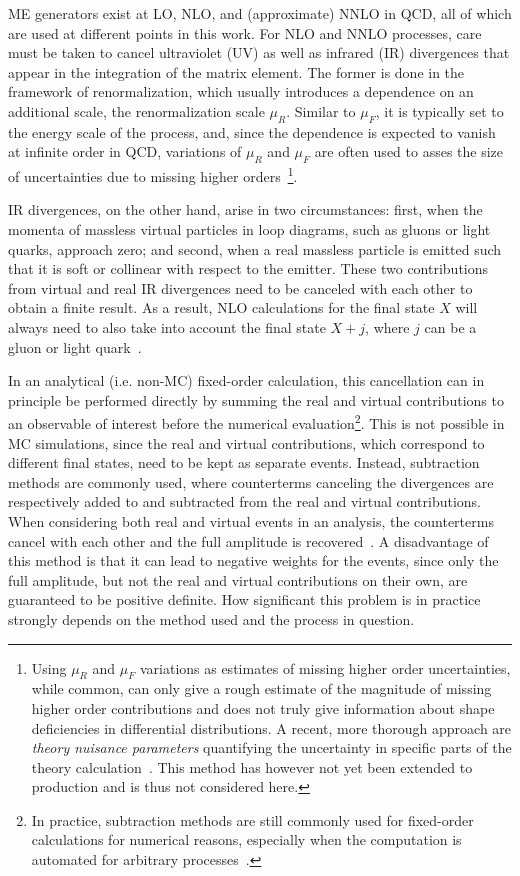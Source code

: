 ME generators exist at LO, NLO, and (approximate) NNLO in QCD, all of which are used at different points in this work. For NLO and NNLO processes, care must be taken to cancel ultraviolet (UV) as well as infrared (IR) divergences that appear in the integration of the matrix element. The former is done in the framework of renormalization, which usually introduces a dependence on an additional scale, the renormalization scale $\mu_R$. Similar to $\mu_F$, it is typically set to the energy scale of the process, and, since the dependence is expected to vanish at infinite order in QCD, variations of $\mu_R$ and $\mu_F$ are often used to asses the size of uncertainties due to missing higher orders~\cite{Schwartz:2014sze}\footnote{Using $\mu_R$ and $\mu_F$ variations as estimates of missing higher order uncertainties, while common, can only give a rough estimate of the magnitude of missing higher order contributions and does not truly give information about shape deficiencies in differential distributions. A recent, more thorough approach are \textit{theory nuisance parameters} quantifying the uncertainty in specific parts of the theory calculation~\cite{Tackmann:2024kci}. This method has however not yet been extended to \ttbar production and is thus not considered here.}.

IR divergences, on the other hand, arise in two circumstances: first, when the momenta of massless virtual particles in loop diagrams, such as gluons or light quarks, approach zero; and second, when a real massless particle is emitted such that it is soft or collinear with respect to the emitter. These two contributions from virtual and real IR divergences need to be canceled with each other to obtain a finite result. As a result, NLO calculations for the final state $X$ will always need to also take into account the final state $X+j$, where $j$ can be a gluon or light quark~\cite{Nason:2012pr}. 

In an analytical (i.e. non-MC) fixed-order calculation, this cancellation can in principle be performed directly by summing the real and virtual contributions to an observable of interest before the numerical evaluation\footnote{In practice, subtraction methods are still commonly used for fixed-order calculations for numerical reasons, especially when the computation is automated for arbitrary processes~\cite{Skands:2012ts}.}. This is not possible in MC simulations, since the real and virtual contributions, which correspond to different final states, need to be kept as separate events. Instead, subtraction methods are commonly used, where counterterms canceling the divergences are respectively added to and subtracted from the real and virtual contributions. When considering both real and virtual events in an analysis, the counterterms cancel with each other and the full amplitude is recovered~\cite{Skands:2012ts}. A disadvantage of this method is that it can lead to negative weights for the events, since only the full amplitude, but not the real and virtual contributions on their own, are guaranteed to be positive definite. How significant this problem is in practice strongly depends on the method used and the process in question.

